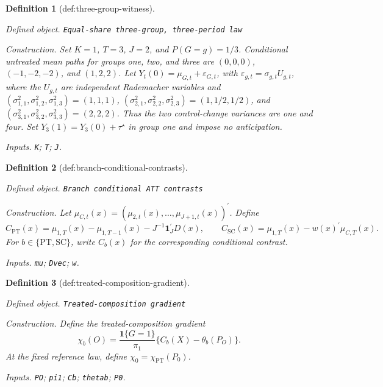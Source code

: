 \documentclass{article}
\newtheorem{definition}{Definition}
\begin{document}
\begin{definition}[def:three-group-witness]\label{def:three-group-witness}
\par\smallskip\noindent\emph{Defined object.} \texttt{Equal-\allowbreak{}share three-\allowbreak{}group,\allowbreak{} three-\allowbreak{}period law}
\par\smallskip\noindent\emph{Construction.} Set \(K=1\), \(T=3\), \(J=2\), and \(P(G=g)=1/3\). Conditional untreated mean paths for groups one, two, and three are \((0,0,0)\), \((-1,-2,-2)\), and \((1,2,2)\). Let \(Y_t(0)=\mu_{G,t}+\varepsilon_{G,t}\), with \(\varepsilon_{g,t}=\sigma_{g,t}U_{g,t}\), where the \(U_{g,t}\) are independent Rademacher variables and \((\sigma_{1,1}^2,\sigma_{1,2}^2,\sigma_{1,3}^2)=(1,1,1)\), \((\sigma_{2,1}^2,\sigma_{2,2}^2,\sigma_{2,3}^2)=(1,1/2,1/2)\), and \((\sigma_{3,1}^2,\sigma_{3,2}^2,\sigma_{3,3}^2)=(2,2,2)\). Thus the two control-change variances are one and four. Set \(Y_3(1)=Y_3(0)+\tau^{\star}\) in group one and impose no anticipation.
\par\smallskip\noindent\emph{Inputs.} \texttt{K}; \texttt{T}; \texttt{J}.
\end{definition}

\begin{definition}[def:branch-conditional-contrasts]\label{def:branch-conditional-contrasts}
\par\smallskip\noindent\emph{Defined object.} \texttt{Branch conditional ATT contrasts}
\par\smallskip\noindent\emph{Construction.} Let \(\mu_{C,t}(x)=(\mu_{2,t}(x),\ldots,\mu_{J+1,t}(x))^{\prime}\). Define
\[
 C_{\mathrm{PT}}(x)=\mu_{1,T}(x)-\mu_{1,T-1}(x)-J^{-1}\mathbf 1_J^{\prime}D(x),
 \qquad
 C_{\mathrm{SC}}(x)=\mu_{1,T}(x)-w(x)^{\prime}\mu_{C,T}(x).
\]
For \(b\in\{\mathrm{PT},\mathrm{SC}\}\), write \(C_b(x)\) for the corresponding conditional contrast.
\par\smallskip\noindent\emph{Inputs.} \texttt{mu}; \texttt{Dvec}; \texttt{w}.
\end{definition}

\begin{definition}[def:treated-composition-gradient]\label{def:treated-composition-gradient}
\par\smallskip\noindent\emph{Defined object.} \texttt{Treated-\allowbreak{}composition gradient}
\par\smallskip\noindent\emph{Construction.} Define the treated-composition gradient
\[
 \chi_b(O)=\frac{\mathbf 1\{G=1\}}{\pi_1}
 \{C_b(X)-\theta_b(P_O)\}.
\]
At the fixed reference law, define \(\chi_0=\chi_{\mathrm{PT}}(P_0)\).
\par\smallskip\noindent\emph{Inputs.} \texttt{PO}; \texttt{pi1}; \texttt{Cb}; \texttt{thetab}; \texttt{P0}.
\end{definition}
\end{document}
